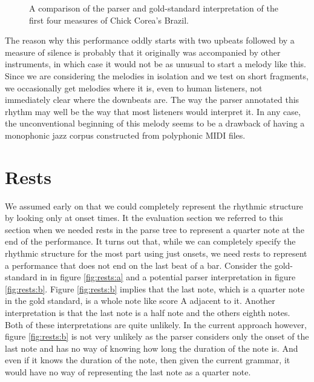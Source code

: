 \begin{figure}
\centering
{}

\caption{A comparison of the parser and gold-standard interpretation of the first four measures of Chick Corea's Brazil.}
\label{fig:brazil}
\end{figure}

The reason why this performance oddly starts with two upbeats followed by a measure of silence is probably that it originally was accompanied by other instruments, in which case it would not be as unusual to start a melody like this. Since we are considering the melodies in isolation and we test on short fragments, we occasionally get melodies where it is, even to human listeners, not immediately clear where the downbeats are. The way the parser annotated this rhythm may well be the way that most listeners would interpret it. In any case, the unconventional beginning of this melody seems to be a drawback of having a monophonic jazz corpus constructed from polyphonic MIDI files.

\section{Rests}

We assumed early on that we could completely represent the rhythmic structure by looking only at onset times. It the evaluation section we referred to this section when we needed rests in the parse tree to represent a quarter note at the end of the performance. It turns out that, while we can completely specify the rhythmic structure for the most part using just onsets, we need rests to represent a performance that does not end on the last beat of a bar. Consider the gold-standard in in figure \ref{fig:rests:a} and a potential parser interpretation in figure \ref{fig:rests:b}. Figure \ref{fig:rests:b} implies that the last note, which is a quarter note in the gold standard, is a whole note like score A adjacent to it. Another interpretation is that the last note is a half note and the others eighth notes. Both of these interpretations are quite unlikely. In the current approach however, figure \ref{fig:rests:b} is not very unlikely as the parser considers only the onset of the last note and has no way of knowing how long the duration of the note is. And even if it knows the duration of the note, then given the current grammar, it would have no way of representing the last note as a quarter note. 

